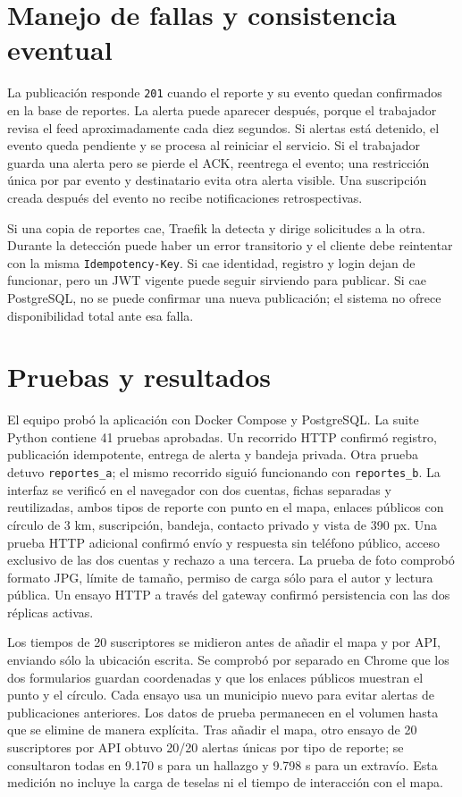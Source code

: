 \documentclass[11pt,letterpaper]{article}
\begin{document}
\section{Manejo de fallas y consistencia eventual}
La publicación responde \texttt{201} cuando el reporte y su evento quedan confirmados en la base de reportes. La alerta puede aparecer después, porque el trabajador revisa el feed aproximadamente cada diez segundos. Si alertas está detenido, el evento queda pendiente y se procesa al reiniciar el servicio. Si el trabajador guarda una alerta pero se pierde el ACK, reentrega el evento; una restricción única por par evento y destinatario evita otra alerta visible. Una suscripción creada después del evento no recibe notificaciones retrospectivas.

Si una copia de reportes cae, Traefik la detecta y dirige solicitudes a la otra. Durante la detección puede haber un error transitorio y el cliente debe reintentar con la misma \texttt{Idempotency-Key}. Si cae identidad, registro y login dejan de funcionar, pero un JWT vigente puede seguir sirviendo para publicar. Si cae PostgreSQL, no se puede confirmar una nueva publicación; el sistema no ofrece disponibilidad total ante esa falla.

\section{Pruebas y resultados}
El equipo probó la aplicación con Docker Compose y PostgreSQL. La suite Python contiene 41 pruebas aprobadas. Un recorrido HTTP confirmó registro, publicación idempotente, entrega de alerta y bandeja privada. Otra prueba detuvo \texttt{reportes\_a}; el mismo recorrido siguió funcionando con \texttt{reportes\_b}. La interfaz se verificó en el navegador con dos cuentas, fichas separadas y reutilizadas, ambos tipos de reporte con punto en el mapa, enlaces públicos con círculo de 3 km, suscripción, bandeja, contacto privado y vista de 390 px. Una prueba HTTP adicional confirmó envío y respuesta sin teléfono público, acceso exclusivo de las dos cuentas y rechazo a una tercera. La prueba de foto comprobó formato JPG, límite de tamaño, permiso de carga sólo para el autor y lectura pública. Un ensayo HTTP a través del gateway confirmó persistencia con las dos réplicas activas.



Los tiempos de 20 suscriptores se midieron antes de añadir el mapa y por API, enviando sólo la ubicación escrita. Se comprobó por separado en Chrome que los dos formularios guardan coordenadas y que los enlaces públicos muestran el punto y el círculo. Cada ensayo usa un municipio nuevo para evitar alertas de publicaciones anteriores. Los datos de prueba permanecen en el volumen hasta que se elimine de manera explícita.
Tras añadir el mapa, otro ensayo de 20 suscriptores por API obtuvo 20/20 alertas únicas por tipo de reporte; se consultaron todas en 9.170 s para un hallazgo y 9.798 s para un extravío. Esta medición no incluye la carga de teselas ni el tiempo de interacción con el mapa.
\end{document}
